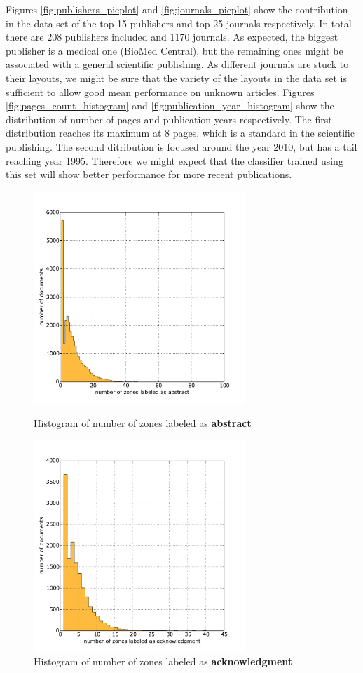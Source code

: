 \quad
Figures \ref{fig:publishers_pieplot} and \ref{fig:journals_pieplot} show the contribution in the data set of the top 15 publishers and top 25 journals respectively. In total there are 208 publishers included and 1170 journals. As expected, the biggest publisher is a medical one (BioMed Central), but the remaining ones might be associated with a general scientific publishing. As different journals are stuck to their layouts, we might be sure that the variety of the layouts in the data set is sufficient to allow good mean performance on unknown articles. 
\quad
Figures \ref{fig:pages_count_histogram} and \ref{fig:publication_year_histogram} show the distribution of number of pages and publication years respectively. The first distribution reaches its maximum at 8 pages, which is a standard in the scientific publishing. The second ditribution is focused around the year 2010, but has a tail reaching year 1995. Therefore we might expect that the classifier trained using this set will show better performance for more recent publications.
\begin{figure}[ht]
\centering
\begin{minipage}[t!]{0.48\linewidth}
  \includegraphics[width=8cm]{plots/abstract_histogram}
  \caption{Histogram of number of zones labeled as \textbf{abstract}}
  \label{fig:abstract_histogram}
\end{minipage}
\quad
\begin{minipage}[t!]{0.48\linewidth}
  \includegraphics[width=8cm]{plots/acknowledgment_histogram}
  \caption{Histogram of number of zones labeled as \textbf{acknowledgment}}
  \label{fig:acknowledgment_histogram}
\end{minipage}
\end{figure}

